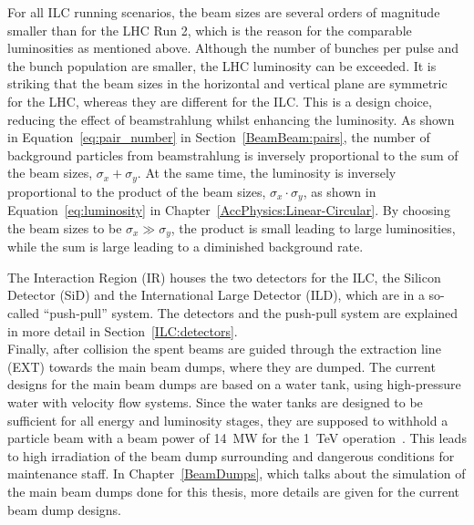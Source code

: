 For all ILC running scenarios, the beam sizes are several orders of magnitude smaller than for the LHC Run 2, which is the reason for the comparable luminosities as mentioned above.
Although the number of bunches per pulse and the bunch population are smaller, the LHC luminosity can be exceeded.
It is striking that the beam sizes in the horizontal and vertical plane are symmetric for the LHC, whereas they are different for the ILC.
This is a design choice, reducing the effect of beamstrahlung whilst enhancing the luminosity.
As shown in Equation~\ref{eq:pair_number} in Section~\ref{BeamBeam:pairs}, the number of background particles from beamstrahlung is inversely proportional to the sum of the beam sizes, $\sigma_x+\sigma_y$.
At the same time, the luminosity is inversely proportional to the product of the beam sizes, $\sigma_x\cdot\sigma_y$, as shown in Equation~\ref{eq:luminosity} in Chapter~\ref{AccPhysics:Linear-Circular}.
By choosing the beam sizes to be $\sigma_x\gg\sigma_y$, the product is small leading to large luminosities, while the sum is large leading to a diminished background rate.

The Interaction Region (IR) houses the two detectors for the ILC, the Silicon Detector (SiD) and the International Large Detector (ILD), which are in a so-called ``push-pull'' system.
The detectors and the push-pull system are explained in more detail in Section~\ref{ILC:detectors}.\\
Finally, after collision the spent beams are guided through the extraction line (EXT) towards the main beam dumps, where they are dumped.
The current designs for the main beam dumps are based on a water tank, using high-pressure water with velocity flow systems.
Since the water tanks are designed to be sufficient for all energy and luminosity stages, they are supposed to withhold a particle beam with a beam power of \SI{14}{\mega\watt} for the \SI{1}{\TeV} operation~\cite[p. 18]{TDR32}.
This leads to high irradiation of the beam dump surrounding and dangerous conditions for maintenance staff.
In Chapter~\ref{BeamDumps}, which talks about the simulation of the main beam dumps done for this thesis, more details are given for the current beam dump designs.

